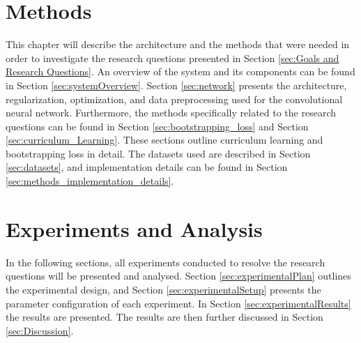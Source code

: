 \documentclass[a4paper]{book}
\begin{document}
\chapter{Methods}
\label{cha:architectureAndModel}
This chapter will describe the architecture and the methods that were needed in order to investigate the research questions presented in Section \ref{sec:Goals and Research Questions}. An overview of the system and its components can be found in Section \ref{sec:systemOverview}. Section \ref{sec:network} presents the architecture, regularization, optimization, and data preprocessing used for  the convolutional neural network. Furthermore, the methods specifically related to the research questions can be found in Section \ref{sec:bootstrapping_loss} and Section \ref{sec:curriculum_Learning}. These sections outline curriculum learning and bootstrapping loss in detail. The datasets used are described in Section \ref{sec:datasets}, and implementation details can be found in Section \ref{sec:methods_implementation_details}.














\chapter{Experiments and Analysis}
In the following sections, all experiments conducted to resolve the research questions will be presented and analysed. Section \ref{sec:experimentalPlan} outlines the experimental design, and Section \ref{sec:experimentalSetup} presents the parameter configuration of each experiment. In Section \ref{sec:experimentalResults} the results are presented. The results are then further discussed in Section \ref{sec:Discussion}.
\label{cha:ResearchAndResults}








\end{document}
